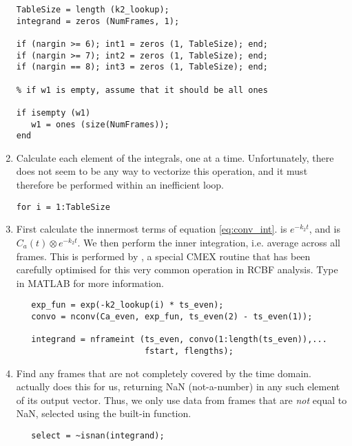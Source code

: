 \begin{enumerate}
\begin{verbatim}
TableSize = length (k2_lookup);
integrand = zeros (NumFrames, 1);

if (nargin >= 6); int1 = zeros (1, TableSize); end;
if (nargin >= 7); int2 = zeros (1, TableSize); end;
if (nargin == 8); int3 = zeros (1, TableSize); end;

% if w1 is empty, assume that it should be all ones

if isempty (w1)
   w1 = ones (size(NumFrames));
end
\end{verbatim}

\item Calculate each element of the integrals, one at a time.
Unfortunately, there does not seem to be any way to vectorize this
operation, and it must therefore be performed within an inefficient
 loop.

\begin{verbatim}
for i = 1:TableSize
\end{verbatim}

\item First calculate the innermost terms of equation
  \ref{eq:conv_int}.   is $e^{-k_2 t}$, and 
  is $C_a (t) \otimes e^{-k_2 t}$.  We then perform the inner
  integration, i.e. average across all frames.  This is performed by
  , a special CMEX routine that has been carefully
  optimised for this very common operation in RCBF analysis.  Type
   in MATLAB for more information.
\begin{verbatim}
   exp_fun = exp(-k2_lookup(i) * ts_even);
   convo = nconv(Ca_even, exp_fun, ts_even(2) - ts_even(1));

   integrand = nframeint (ts_even, convo(1:length(ts_even)),...
                          fstart, flengths);
\end{verbatim}

\item Find any frames that are not completely covered by the
   time domain.   actually does this
  for us, returning NaN (not-a-number) in any such element of its
  output vector.  Thus, we only use data from frames that are {\em
  not} equal to NaN, selected using the built-in 
  function.
\begin{verbatim}
   select = ~isnan(integrand);
\end{verbatim}


\end{enumerate}
